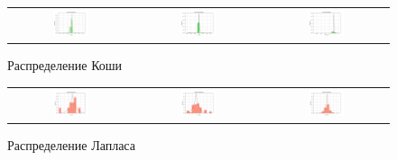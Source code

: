 \documentclass[a4paper,14pt]{article}
\begin{document}
	\begin{figure}[H]
		\centering
		\begin{tabular}{c c c}
			\includegraphics[height = 0.25\textheight, width = 0.31\textwidth]{../image/lab1/lab1_cauchy_10.png}
			& \includegraphics[height = 0.25\textheight, width = 0.31\textwidth]{../image/lab1/lab1_cauchy_50.png}
			& \includegraphics[height = 0.25\textheight, width = 0.31\textwidth]{../image/lab1/lab1_cauchy_1000.png}
		\end{tabular}
		\caption{Распределение Коши}
	\end{figure}
	
	\begin{figure}[H]
		\centering
		\begin{tabular}{c c c}
			\includegraphics[height = 0.25\textheight, width = 0.31\textwidth]{../image/lab1/lab1_laplace_10.png}
			& \includegraphics[height = 0.25\textheight, width = 0.31\textwidth]{../image/lab1/lab1_laplace_50.png}
			& \includegraphics[height = 0.25\textheight, width = 0.31\textwidth]{../image/lab1/lab1_laplace_1000.png}
		\end{tabular}
		\caption{Распределение Лапласа}
	\end{figure}
	
\end{document}
